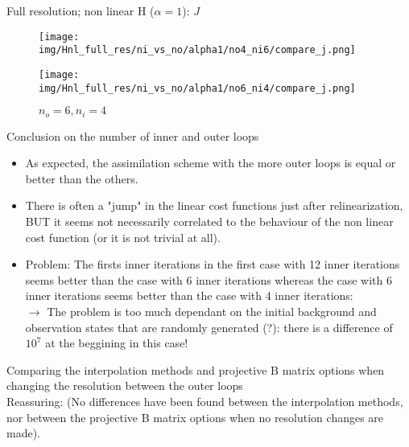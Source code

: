 \documentclass[francais]{beamer}
\begin{document}
\begin{frame}{Full resolution; non linear H ($\alpha = 1$): $J$}
\begin{center}
\begin{figure}
  \texttt{[image: img/Hnl\_full\_res/ni\_vs\_no/alpha1/no4\_ni6/compare\_j.png]}
  \caption{$n_o = 4, n_i = 6$}
\endminipage\hfill
{}
  \texttt{[image: img/Hnl\_full\_res/ni\_vs\_no/alpha1/no6\_ni4/compare\_j.png]}
  \caption{$n_o = 6, n_i = 4$}
\endminipage
\end{figure}
\end{center}
\end{frame}

\begin{frame}{Conclusion on the number of inner and outer loops}
\begin{itemize}
 \item As expected, the assimilation scheme with the more outer loops is equal or better than the others. 
 \item There is often a "jump" in the linear cost functions just after relinearization, BUT it seems not necessarily correlated to the behaviour of the non linear cost function (or it is not trivial at all).
 \item Problem: The firsts inner iterations in the first case with 12 inner iterations seems better than the case with 6 inner iterations whereas the case with 6 inner iterations seems better than the case with 4 inner iterations:\\
 $\longrightarrow$ The problem is too much dependant on the initial background and observation states that are randomly generated (?): there is a difference of $10^7$ at the beggining in this case!
\end{itemize}
\end{frame}

\begin{frame}
\begin{center}
 \large{Comparing the interpolation methods and projective B matrix options when changing the resolution between the outer loops}\\
 Reassuring: (No differences have been found between the interpolation methods, nor between the projective B matrix options when no resolution changes are made).
\end{center}
\end{frame}
\end{document}
